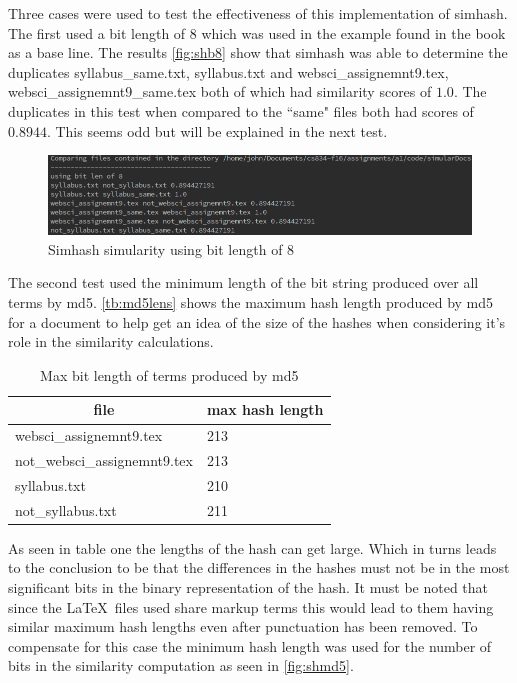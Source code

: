 \documentclass[11pt]{article}
\begin{document}
\noindent
Three cases were used to test the effectiveness of this implementation of simhash. The first used a bit length of 8  which was used in the example found in the book \citep[pp. 64]{CroftMetzlerStrohman200902} as a base line. The results \autoref{fig:shb8} show that simhash was able to determine the duplicates syllabus\_same.txt, syllabus.txt and websci\_assignemnt9.tex, websci\_assignemnt9\_same.tex  both of which had similarity scores of $1.0$. The duplicates in this test when compared to the ``same" files both had scores of  $0.8944$. This seems odd but will be explained in the next test.
\begin{figure}[h]
\centering
	\includegraphics[scale=0.6]{simhashB8.png}
	\caption{Simhash simularity using bit length of 8} \label{fig:shb8}
\end{figure}\newline
The second test used the minimum length of the bit string produced over all terms by md5. \autoref{tb:md5lens} shows the maximum hash length produced by md5 for a document to help get an idea of the size of the hashes when considering it's role in the similarity calculations.
\begin{table}[h]
\centering
\begin{tabular}{|l|l|}
\hline
\multicolumn{1}{|c|}{file} & \multicolumn{1}{c|}{max hash length} \\ \hline
websci\_assignemnt9.tex & 213 \\ \hline
not\_websci\_assignemnt9.tex & 213 \\ \hline
syllabus.txt & 210 \\ \hline
not\_syllabus.txt & 211 \\ \hline
\end{tabular}
\caption{Max bit length of terms produced by md5}
\label{tb:md5lens}
\end{table}\newline
As seen in table one the lengths of the hash can get large. Which in turns leads to the conclusion to be that the differences in the hashes must not be in the most significant bits in the binary representation of the hash. It must be noted that since the \LaTeX \ files used share markup terms this would lead to them having similar maximum hash lengths even after punctuation has been removed. To compensate for this case the minimum hash length was used for the number of bits in the similarity computation as seen in  \autoref{fig:shmd5}.
\end{document}
